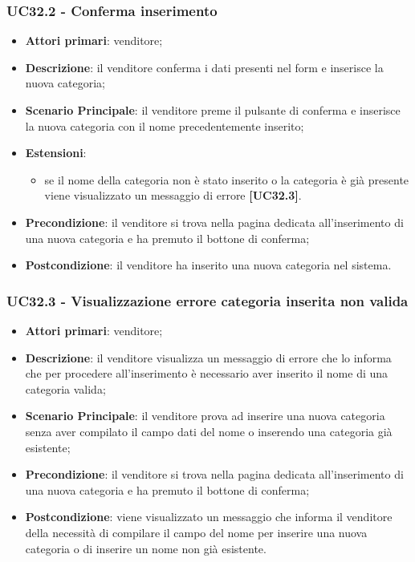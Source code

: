 \subsubsection{UC32.2 - Conferma inserimento}
\begin{itemize}
\item \textbf{Attori primari}: venditore;
\item \textbf{Descrizione}: il venditore conferma i dati presenti nel form e inserisce la nuova categoria;
\item \textbf{Scenario Principale}: il venditore preme il pulsante di conferma e inserisce la nuova categoria con il nome precedentemente inserito;
\item \textbf{Estensioni}: 
\begin{itemize}
	\item se il nome della categoria non è stato inserito o la categoria è già presente viene visualizzato un messaggio di errore \textbf{[UC32.3]}.
\end{itemize} 
\item \textbf{Precondizione}: il venditore si trova nella pagina dedicata all'inserimento di una nuova categoria e ha premuto il bottone di conferma;
\item \textbf{Postcondizione}: il venditore ha inserito una nuova categoria nel sistema.
\end{itemize}

\subsubsection{UC32.3 - Visualizzazione errore categoria inserita non valida}
\begin{itemize}
\item \textbf{Attori primari}: venditore;
\item \textbf{Descrizione}: il venditore visualizza un messaggio di errore che lo informa che per procedere all'inserimento è necessario aver inserito il nome di una categoria valida;
\item \textbf{Scenario Principale}: il venditore prova ad inserire una nuova categoria senza aver compilato il campo dati del nome o inserendo una categoria già esistente;
\item \textbf{Precondizione}: il venditore si trova nella pagina dedicata all'inserimento di una nuova categoria e ha premuto il bottone di conferma;
\item \textbf{Postcondizione}: viene visualizzato un messaggio che informa il venditore della necessità di compilare il campo del nome per inserire una nuova categoria o di inserire un nome non già esistente.
\end{itemize}

